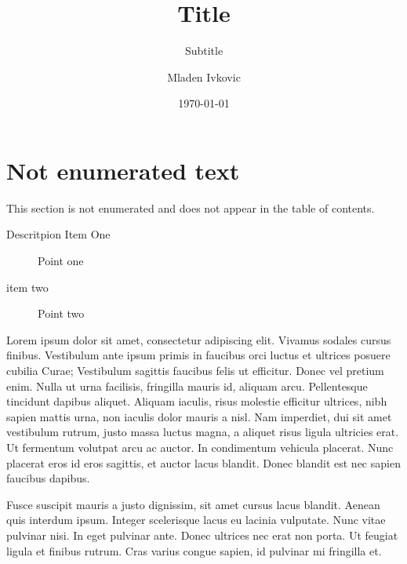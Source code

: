 \documentclass[12pt, a4paper, onepage, english,singlespacing, parskip]{scrartcl}
\begin{document}

\title{Title}
\subtitle{Subtitle}
\author{Mladen Ivkovic}
\date{\today}




\maketitle
\clearpage


\section*{Not enumerated text}
This section is not enumerated and does not appear in the table of contents.
\begin{description}
	\item[Descritpion Item One] Point one
	\item[item two] Point two
\end{description}


Lorem ipsum dolor sit amet, consectetur adipiscing elit. Vivamus sodales cursus finibus. Vestibulum ante ipsum primis in faucibus orci luctus et ultrices posuere cubilia Curae; Vestibulum sagittis faucibus felis ut efficitur. Donec vel pretium enim. Nulla ut urna facilisis, fringilla mauris id, aliquam arcu. Pellentesque tincidunt dapibus aliquet. Aliquam iaculis, risus molestie efficitur ultrices, nibh sapien mattis urna, non iaculis dolor mauris a nisl. Nam imperdiet, dui sit amet vestibulum rutrum, justo massa luctus magna, a aliquet risus ligula ultricies erat. Ut fermentum volutpat arcu ac auctor. In condimentum vehicula placerat. Nunc placerat eros id eros sagittis, et auctor lacus blandit. Donec blandit est nec sapien faucibus dapibus.

Fusce suscipit mauris a justo dignissim, sit amet cursus lacus blandit. Aenean quis interdum ipsum. Integer scelerisque lacus eu lacinia vulputate. Nunc vitae pulvinar nisi. In eget pulvinar ante. Donec ultrices nec erat non porta. Ut feugiat ligula et finibus rutrum. Cras varius congue sapien, id pulvinar mi fringilla et.
\end{document}

